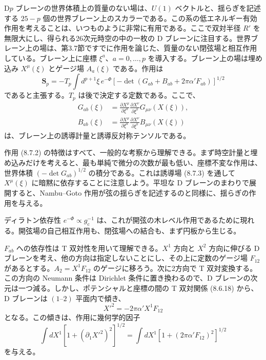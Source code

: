 D$p$ ブレーンの世界体積上の質量のない場は、$U(1)$ ベクトルと、揺らぎを記述する $25-p$ 個の世界ブレーン上のスカラーである。この系の低エネルギー有効作用を考えることは、いつものように非常に有用である。ここで双対半径 $R'$ を無限大にし、得られる26次元時空の中の一枚の D ブレーンに注目する。世界ブレーン上の場は、第3.7節ですでに作用を論じた、質量のない閉弦場と相互作用している。ブレーン上に座標 $\xi^a$、$a=0,\ldots,p$ を導入する。ブレーン上の場は埋め込み $X^\mu(\xi)$ とゲージ場 $A_a(\xi)$ である。作用は
\begin{equation}
\boldsymbol S_p=-T_p\int d^{p+1}\xi\,e^{-\Phi}
\left[-\det(G_{ab}+B_{ab}+2\pi\alpha'F_{ab})\right]^{1/2}
\tag{8.7.2}\label{eq:8.7.2}
\end{equation}
であると主張する。$T_p$ は後で決定する定数である。ここで、
\begin{equation}
\begin{split}
G_{ab}(\xi)&=\frac{\partial X^\mu}{\partial\xi^a}
\frac{\partial X^\nu}{\partial\xi^b}G_{\mu\nu}(X(\xi)),\\
B_{ab}(\xi)&=\frac{\partial X^\mu}{\partial\xi^a}
\frac{\partial X^\nu}{\partial\xi^b}B_{\mu\nu}(X(\xi))
\end{split}
\tag{8.7.3}\label{eq:8.7.3}
\end{equation}
は、ブレーン上の誘導計量と誘導反対称テンソルである。

作用 (8.7.2) の特徴はすべて、一般的な考察から理解できる。まず時空計量と埋め込みだけを考えると、最も単純で微分の次数が最も低い、座標不変な作用は、世界体積 $(-\det G_{ab})^{1/2}$ の積分である。これは誘導場 (8.7.3) を通して $X^\mu(\xi)$ に暗黙に依存することに注意しよう。平坦な D ブレーンのまわりで展開すると、Nambu--Goto 作用が弦の揺らぎを記述するのと同様に、揺らぎの作用を与える。

ディラトン依存性 $e^{-\Phi}\propto g_{\mathrm c}^{-1}$ は、これが開弦の木レベル作用であるために現れる。開弦場の自己相互作用も、閉弦場への結合も、まず円板から生じる。

$F_{ab}$ への依存性は T 双対性を用いて理解できる。$X^1$ 方向と $X^2$ 方向に伸びる D ブレーンを考え、他の方向は指定しないことにし、その上に定数のゲージ場 $F_{12}$ があるとする。$A_2=X^1F_{12}$ のゲージに移ろう。次に2方向で T 双対変換する。この方向の Neumann 条件は Dirichlet 条件に置き換わるので、D ブレーンの次元は一つ減る。しかし、ポテンシャルと座標の間の T 双対関係 (8.6.18) から、D ブレーンは $(1\text{--}2)$ 平面内で傾き、
\begin{equation}
X'^2=-2\pi\alpha'X^1F_{12}
\tag{8.7.4}\label{eq:8.7.4}
\end{equation}
となる。この傾きは、作用に幾何学的因子
\begin{equation}
\int dX^1\left[1+(\partial_1X'^2)^2\right]^{1/2}
=\int dX^1\left[1+(2\pi\alpha'F_{12})^2\right]^{1/2}
\tag{8.7.5}\label{eq:8.7.5}
\end{equation}
を与える。

